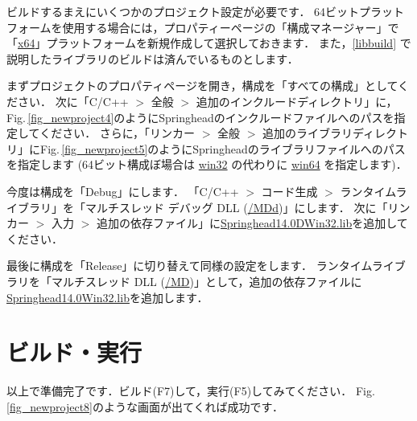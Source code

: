 \KLUDGE ビルドするまえにいくつかのプロジェクト設定が必要です．
64ビットプラットフォームを使用する場合には，プロパティーページの「構成マネージャー」で「\url{x64}」プラットフォームを新規作成して選択しておきます．
\KLUDGE また，\ref{libbuild} で説明したライブラリのビルドは済んでいるものとします．

\KLUDGE まずプロジェクトのプロパティページを開き，構成を「すべての構成」としてください．
\KLUDGE 次に「C/C++ $>$ 全般 $>$ 追加のインクルードディレクトリ」に，Fig.\,\ref{fig_newproject4}のようにSpringheadのインクルードファイルへのパスを指定してください．
\KLUDGE さらに，「リンカー $>$ 全般 $>$ 追加のライブラリディレクトリ」にFig.\,\ref{fig_newproject5}のようにSpringheadのライブラリファイルへのパスを指定します (64ビット構成ぼ場合は \url{win32} の代わりに \url{win64} を指定します)．

\KLUDGE 今度は構成を「Debug」にします．
\KLUDGE 「C/C++ $>$ コード生成 $>$ ランタイムライブラリ」を「マルチスレッド デバッグ DLL (\url{/MDd})」にします．
\KLUDGE 次に「リンカー $>$ 入力 $>$ 追加の依存ファイル」に\url{Springhead14.0DWin32.lib}を追加してください．

\KLUDGE 最後に構成を「Release」に切り替えて同様の設定をします．
\KLUDGE ランタイムライブラリを「マルチスレッド DLL (\url{/MD})」として，追加の依存ファイルに\url{Springhead14.0Win32.lib}を追加します．

\section*{ビルド・実行}

\KLUDGE 以上で準備完了です．ビルド(F7)して，実行(F5)してみてください．
Fig.\,\ref{fig_newproject8}のような画面が出てくれば成功です．
